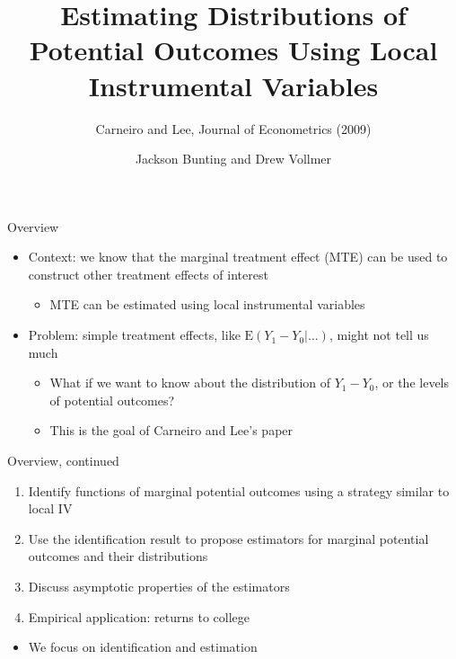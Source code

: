 \documentclass{beamer}
\newcommand{\E}{\mathrm{E}} %
\begin{document}
\title[Distributions of Potential Outcomes]{Estimating Distributions
  of Potential Outcomes Using Local Instrumental Variables}
\subtitle{Carneiro and Lee, Journal of Econometrics (2009)}
\author[]{Jackson Bunting and Drew Vollmer}
\frame{\maketitle}


\begin{frame}{Overview}

\begin{itemize}

\item Context: we know that the marginal treatment effect (MTE) can be
  used to construct other treatment effects of interest
\begin{itemize}
\item MTE can be estimated using local instrumental variables
\end{itemize}

\pause

\item Problem: simple treatment effects, like $\E(Y_1 - Y_0 | \dots)$,
  might not tell us much
\begin{itemize}
\item What if we want to know about the distribution of $Y_1 - Y_0$,
  or the levels of potential outcomes?

\pause

\item This is the goal of Carneiro and Lee's paper
\end{itemize}

\end{itemize}

\end{frame}


\begin{frame}{Overview, continued}

\begin{enumerate}

\item Identify functions of marginal potential outcomes using a
  strategy similar to local IV

\item Use the identification result to propose estimators for marginal
  potential outcomes and their distributions

\item Discuss asymptotic properties of the estimators

\item Empirical application: returns to college

\end{enumerate}

\pause

\begin{itemize}
\item We focus on identification and estimation
\end{itemize}

\end{frame}
\end{document}
